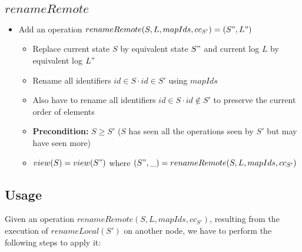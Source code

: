 \documentclass[a4paper]{article}
\begin{document}
\subsection{$renameRemote$}

\begin{itemize}
  \item Add an operation $renameRemote(S, L, mapIds, cc_{S'}) = (S", L")$
  \begin{itemize}
    \item Replace current state $S$ by equivalent state $S"$ and current log $L$ by equivalent log $L"$
    \item Rename all identifiers $id \in S \cdot id \in S'$ using $mapIds$
    \item Also have to rename all identifiers $id \in S \cdot id \notin S'$ to preserve the current order of elements
    \item \textbf{Precondition: } $S \geq S'$ ($S$ has seen all the operations seen by $S'$ but may have seen more)
    \item $view(S) = view(S")$ where $(S", \_) = renameRemote(S, L, mapIds, cc_{S'})$
  \end{itemize}
\end{itemize}

\subsection{Usage}
\label{sec:usage}

Given an operation $renameRemote(S, L, mapIds, cc_{S'})$,
resulting from the execution of $renameLocal(S')$ on another node,
we have to perform the following steps to apply it:
\end{document}
